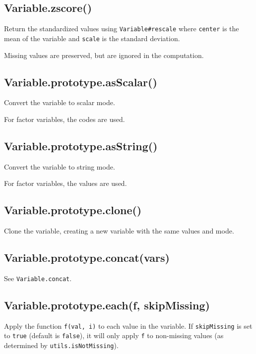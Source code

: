 \documentclass{article}
\begin{document}
    \subsection*{Variable.zscore()}
    Return the standardized values using \texttt{Variable\#rescale} where \texttt{center} is the
mean of the variable and \texttt{scale} is the standard deviation.


Missing values are preserved, but are ignored in the computation.


    \subsection*{Variable.prototype.asScalar()}
    Convert the variable to scalar mode.


For factor variables, the codes are used.


    \subsection*{Variable.prototype.asString()}
    Convert the variable to string mode.


For factor variables, the values are used.


    \subsection*{Variable.prototype.clone()}
    Clone the variable, creating a new variable with the same values and mode.


    \subsection*{Variable.prototype.concat(vars)}
    See \texttt{Variable.concat}.


    \subsection*{Variable.prototype.each(f, skipMissing)}
    Apply the function \texttt{f(val, i)} to each value in the variable.
If \texttt{skipMissing} is set to \texttt{true} (default is \texttt{false}), it will only apply
\texttt{f} to non-missing values (as determined by \texttt{utils.isNotMissing}).
\end{document}
